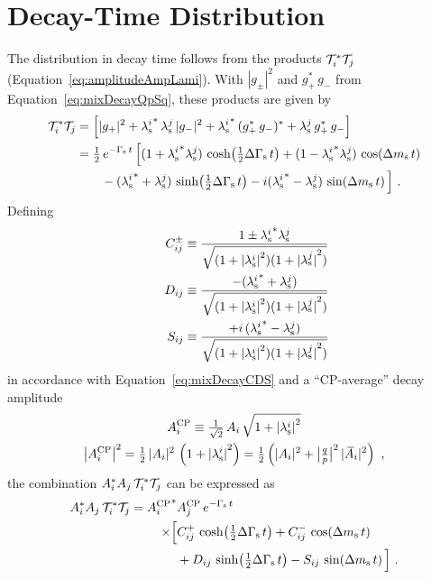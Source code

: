 \section{Decay-Time Distribution}
\label{sec:pheno_time}

The distribution in decay time follows from the products $\timeAmp^*\timeAmp[j]$ (Equation~\ref{eq:amplitudeAmpLami}). With $|g_\pm|^2$ and
$g_+^*\,g_-$ from Equation~\ref{eq:mixDecayQpSq}, these products are given by
\begin{align}
  \timeAmp^*\timeAmp[j]
  &=\left[ |g_+|^2 + \lamsi^*\,\lamsi[j]\, |g_-|^2 + \lamsi^*\, (g_+^*\,g_-)^* + \lamsi[j]\, g_+^*\,g_- \right] \nonumber \\
  &=\tfrac{1}{2}\, \eGst\, \Big[    (1+\lamsi^*\lamsi[j]) \, \cDGs
                                +   (1-\lamsi^*\lamsi[j]) \, \cDms \nonumber \\
  &\quad\quad            -   (\lamsi^* + \lamsi[j])\,   \sDGs
                                - i (\lamsi^* - \lamsi[j])\,   \sDms \Big] \ .
\end{align}
Defining
\begin{equation}
  \label{eq:CDSPolarDep}
  \begin{aligned}
    \Cf[ij]^\pm    &\equiv \frac{1\pm\lamsi^*\lamsi[j]}{\sqrt{(1+\lamsiSq)(1+\lamsiSq[j])}} \\
    \qquad \Df[ij] &\equiv \frac{-    (\lamsi^* + \lamsi[j])}{\sqrt{(1+\lamsiSq)(1+\lamsiSq[j])}} \\
    \qquad \Sf[ij] &\equiv \frac{+i\, (\lamsi^* - \lamsi[j])}{\sqrt{(1+\lamsiSq)(1+\lamsiSq[j])}}
  \end{aligned}
\end{equation}
in accordance with Equation~\ref{eq:mixDecayCDS} and a ``CP-average'' decay amplitude
\begin{equation}
  \label{eq:CPAvAmp}
  \begin{gathered}
    \AAv \equiv \tfrac{1}{\sqrt{2}}\, \Ai\, \sqrt{1+\lamsiSq} \\
    \left|\AAv\right|^2
      = \tfrac{1}{2}\, |\Ai|^2\, \left(1 + \lamsiSq\right)
      = \tfrac{1}{2} \left(|\Ai|^2 + \qpAbsAlt^2\,|\Abari|^2\right) \ ,
  \end{gathered}
\end{equation}
the combination $\Ai^*\Ai[j]\,\timeAmp^*\timeAmp[j]$ can be expressed as
\begin{equation}
  \label{eq:timeDep}
  \begin{aligned}
    \Ai^*\Ai[j]\,\timeAmp^*\timeAmp[j]
      = \AAvConj&\AAv[{\Ai[j]}]\, \eGst \\
        \times\Big[ &\Cf[ij]^+\,\cDGs + \Cf[ij]^-\,\cDms \\
                    &+ \Df[ij]\,\sDGs - \Sf[ij]\,\sDms \Big] \ .
  \end{aligned}
\end{equation}

